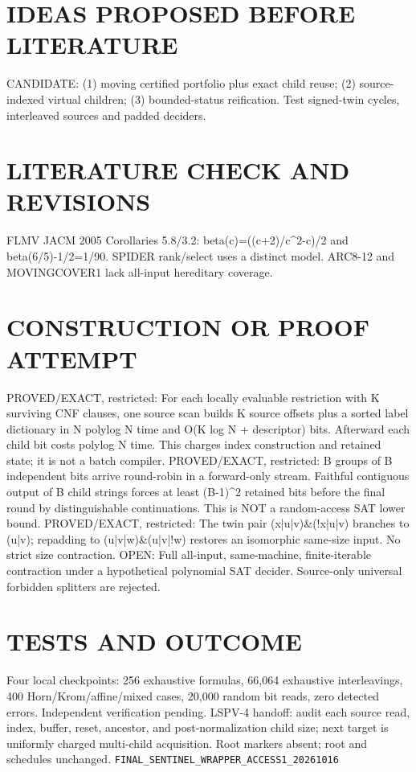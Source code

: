 \section*{IDEAS PROPOSED BEFORE LITERATURE}
CANDIDATE: (1) moving certified portfolio plus exact child reuse; (2) source-indexed virtual children; (3) bounded-status reification. Test signed-twin cycles, interleaved sources and padded deciders.
\section*{LITERATURE CHECK AND REVISIONS}
FLMV JACM 2005 Corollaries 5.8/3.2: beta(c)=((c+2)/c^2-c)/2 and beta(6/5)-1/2=1/90. SPIDER rank/select uses a distinct model. ARC8-12 and MOVINGCOVER1 lack all-input hereditary coverage.
\section*{CONSTRUCTION OR PROOF ATTEMPT}
PROVED/EXACT, restricted: For each locally evaluable restriction with K surviving CNF clauses, one source scan builds K source offsets plus a sorted label dictionary in N polylog N time and O(K log N + descriptor) bits. Afterward each child bit costs polylog N time. This charges index construction and retained state; it is not a batch compiler.
PROVED/EXACT, restricted: B groups of B independent bits arrive round-robin in a forward-only stream. Faithful contiguous output of B child strings forces at least (B-1)^2 retained bits before the final round by distinguishable continuations. This is NOT a random-access SAT lower bound.
PROVED/EXACT, restricted: The twin pair (x|u|v)&(!x|u|v) branches to (u|v); repadding to (u|v|w)&(u|v|!w) restores an isomorphic same-size input. No strict size contraction.
OPEN: Full all-input, same-machine, finite-iterable contraction under a hypothetical polynomial SAT decider. Source-only universal forbidden splitters are rejected.
\section*{TESTS AND OUTCOME}
Four local checkpoints: 256 exhaustive formulas, 66,064 exhaustive interleavings, 400 Horn/Krom/affine/mixed cases, 20,000 random bit reads, zero detected errors. Independent verification pending.
LSPV-4 handoff: audit each source read, index, buffer, reset, ancestor, and post-normalization child size; next target is uniformly charged multi-child acquisition. Root markers absent; root and schedules unchanged.
\texttt{FINAL_SENTINEL_WRAPPER_ACCESS1_20261016}